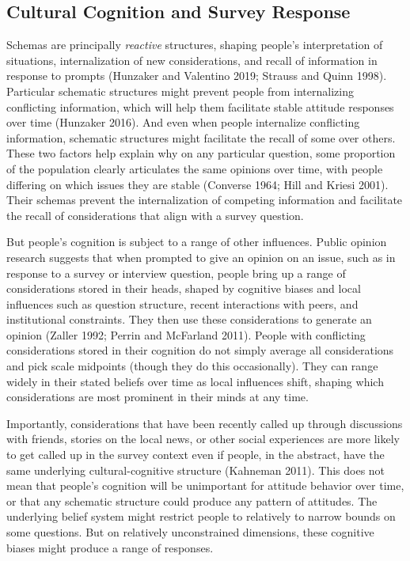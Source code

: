 \documentclass[12pt,]{article}
\begin{document}
\hypertarget{cultural-cognition-and-survey-response}{%
\subsection{Cultural Cognition and Survey Response}\label{cultural-cognition-and-survey-response}}

Schemas are principally \emph{reactive} structures, shaping people's interpretation of situations, internalization of new considerations, and recall of information in response to prompts (Hunzaker and Valentino 2019; Strauss and Quinn 1998). Particular schematic structures might prevent people from internalizing conflicting information, which will help them facilitate stable attitude responses over time (Hunzaker 2016). And even when people internalize conflicting information, schematic structures might facilitate the recall of some over others. These two factors help explain why on any particular question, some proportion of the population clearly articulates the same opinions over time, with people differing on which issues they are stable (Converse 1964; Hill and Kriesi 2001). Their schemas prevent the internalization of competing information and facilitate the recall of considerations that align with a survey question.

But people's cognition is subject to a range of other influences. Public opinion research suggests that when prompted to give an opinion on an issue, such as in response to a survey or interview question, people bring up a range of considerations stored in their heads, shaped by cognitive biases and local influences such as question structure, recent interactions with peers, and institutional constraints. They then use these considerations to generate an opinion (Zaller 1992; Perrin and McFarland 2011). People with conflicting considerations stored in their cognition do not simply average all considerations and pick scale midpoints (though they do this occasionally). They can range widely in their stated beliefs over time as local influences shift, shaping which considerations are most prominent in their minds at any time.

Importantly, considerations that have been recently called up through discussions with friends, stories on the local news, or other social experiences are more likely to get called up in the survey context even if people, in the abstract, have the same underlying cultural-cognitive structure (Kahneman 2011). This does not mean that people's cognition will be unimportant for attitude behavior over time, or that any schematic structure could produce any pattern of attitudes. The underlying belief system might restrict people to relatively to narrow bounds on some questions. But on relatively unconstrained dimensions, these cognitive biases might produce a range of responses.
\end{document}
